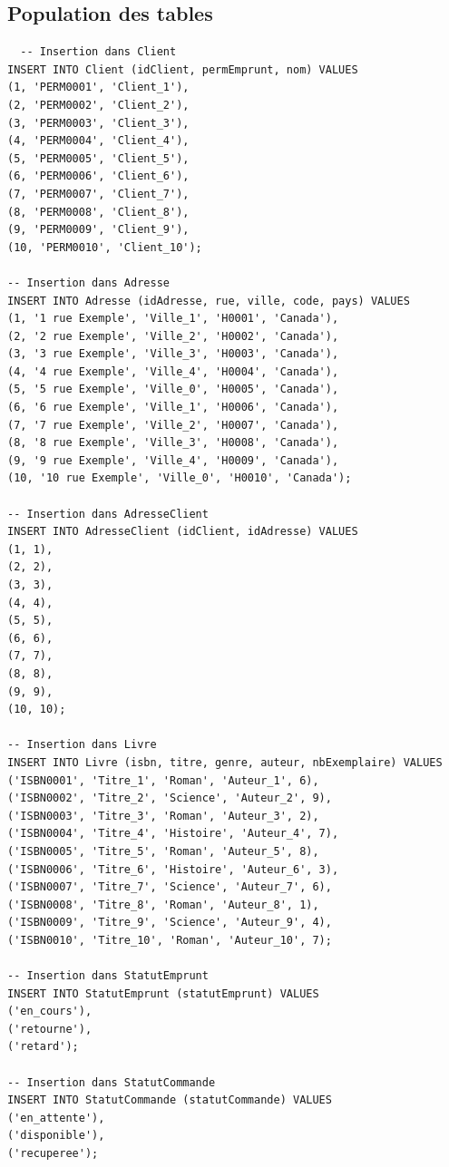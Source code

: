\documentclass{article}
\begin{document}
\subsection{Population des tables}
\begin{lstlisting}
  -- Insertion dans Client
INSERT INTO Client (idClient, permEmprunt, nom) VALUES
(1, 'PERM0001', 'Client_1'),
(2, 'PERM0002', 'Client_2'),
(3, 'PERM0003', 'Client_3'),
(4, 'PERM0004', 'Client_4'),
(5, 'PERM0005', 'Client_5'),
(6, 'PERM0006', 'Client_6'),
(7, 'PERM0007', 'Client_7'),
(8, 'PERM0008', 'Client_8'),
(9, 'PERM0009', 'Client_9'),
(10, 'PERM0010', 'Client_10');

-- Insertion dans Adresse
INSERT INTO Adresse (idAdresse, rue, ville, code, pays) VALUES
(1, '1 rue Exemple', 'Ville_1', 'H0001', 'Canada'),
(2, '2 rue Exemple', 'Ville_2', 'H0002', 'Canada'),
(3, '3 rue Exemple', 'Ville_3', 'H0003', 'Canada'),
(4, '4 rue Exemple', 'Ville_4', 'H0004', 'Canada'),
(5, '5 rue Exemple', 'Ville_0', 'H0005', 'Canada'),
(6, '6 rue Exemple', 'Ville_1', 'H0006', 'Canada'),
(7, '7 rue Exemple', 'Ville_2', 'H0007', 'Canada'),
(8, '8 rue Exemple', 'Ville_3', 'H0008', 'Canada'),
(9, '9 rue Exemple', 'Ville_4', 'H0009', 'Canada'),
(10, '10 rue Exemple', 'Ville_0', 'H0010', 'Canada');

-- Insertion dans AdresseClient
INSERT INTO AdresseClient (idClient, idAdresse) VALUES
(1, 1),
(2, 2),
(3, 3),
(4, 4),
(5, 5),
(6, 6),
(7, 7),
(8, 8),
(9, 9),
(10, 10);

-- Insertion dans Livre
INSERT INTO Livre (isbn, titre, genre, auteur, nbExemplaire) VALUES
('ISBN0001', 'Titre_1', 'Roman', 'Auteur_1', 6),
('ISBN0002', 'Titre_2', 'Science', 'Auteur_2', 9),
('ISBN0003', 'Titre_3', 'Roman', 'Auteur_3', 2),
('ISBN0004', 'Titre_4', 'Histoire', 'Auteur_4', 7),
('ISBN0005', 'Titre_5', 'Roman', 'Auteur_5', 8),
('ISBN0006', 'Titre_6', 'Histoire', 'Auteur_6', 3),
('ISBN0007', 'Titre_7', 'Science', 'Auteur_7', 6),
('ISBN0008', 'Titre_8', 'Roman', 'Auteur_8', 1),
('ISBN0009', 'Titre_9', 'Science', 'Auteur_9', 4),
('ISBN0010', 'Titre_10', 'Roman', 'Auteur_10', 7);

-- Insertion dans StatutEmprunt
INSERT INTO StatutEmprunt (statutEmprunt) VALUES
('en_cours'),
('retourne'),
('retard');

-- Insertion dans StatutCommande
INSERT INTO StatutCommande (statutCommande) VALUES
('en_attente'),
('disponible'),
('recuperee');


\end{lstlisting}
\end{document}
